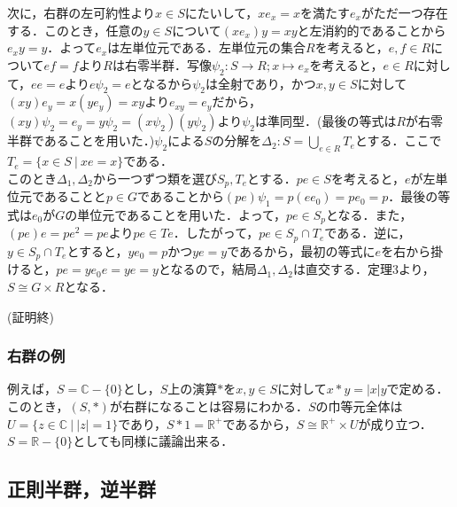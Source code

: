 \documentclass{jsarticle}
\begin{document}
次に，右群の左可約性より$x\in S$にたいして，$xe_x=x$を満たす$e_x$がただ一つ存在する．このとき，任意の$y\in S$について$(xe_x)y=xy$と左消約的であることから$e_xy=y$．よって$e_x$は左単位元である．左単位元の集合$R$を考えると，$e,f\in R$について$ef=f$より$R$は右零半群．写像$\psi_2:S\rightarrow R;x\mapsto e_x$を考えると，$e\in R$に対して，$ee=e$より$e\psi_2=e$となるから$\psi_2$は全射であり，かつ$x,y\in S$に対して$(xy)e_y=x(ye_y)=xy$より$e_{xy}=e_{y}$だから，$(xy)\psi_2=e_y=y\psi_2=(x\psi_2)(y\psi_2)$より$\psi_2$は準同型．(最後の等式は$R$が右零半群であることを用いた．)$\psi_2$による$S$の分解を$\Delta_2:S=\displaystyle\bigcup_{e\in R}T_e$とする．ここで$T_e=\{x\in S\:|\:xe=x\}$である．\\
このとき$\Delta_1,\Delta_2$から一つずつ類を選び$S_p,T_e$とする．$pe\in S$を考えると，$e$が左単位元であることと$p\in G$であることから$(pe)\psi_1=p(ee_0)=pe_0=p$．最後の等式は$e_0$が$G$の単位元であることを用いた．よって，$pe\in S_p$となる．また，$(pe)e=pe^2=pe$より$pe\in Te$．したがって，$pe\in S_p\cap T_e$である．逆に，$y\in S_p\cap T_e$とすると，$ye_0=p$かつ$ye=y$であるから，最初の等式に$e$を右から掛けると，$pe=ye_0e=ye=y$となるので，結局$\Delta_1,\Delta_2$は直交する．定理3より，$S\cong G\times R$となる．
\begin{flushright}
(証明終)
\end{flushright}
\subsubsection{右群の例}
例えば，$S={\mathbb C}-\{0\}$とし，$S$上の演算$*$を$x,y\in S$に対して$x*y=|x|y$で定める．このとき，$(S,*)$が右群になることは容易にわかる．$S$の巾等元全体は$U=\{z\in{\mathbb C}\:|\:|z|=1\}$であり，$S*1={\mathbb R^+}$であるから，$S\cong {\mathbb R^+}\times U$が成り立つ．$S={\mathbb R}-\{0\}$としても同様に議論出来る．
\subsection{正則半群，逆半群}
\end{document}
